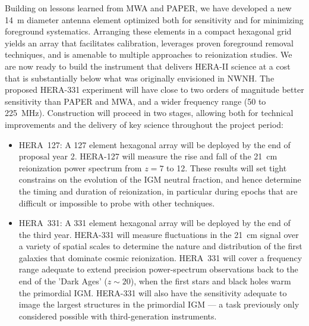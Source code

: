 \documentclass[preprint]{aastex}
\begin{document}
Building on lessons learned from MWA and PAPER, we have developed a new 14~m diameter antenna element 
optimized both for sensitivity and for minimizing foreground systematics.  
Arranging these elements in a compact hexagonal grid yields an array that
facilitates calibration, leverages proven foreground removal techniques, and is amenable 
to multiple approaches to reionization studies. We are now ready to build the instrument
that delivers HERA-II science at a cost that is substantially below what was originally envisioned in NWNH.
The proposed HERA-331 experiment will have close to two orders of magnitude better
sensitivity than PAPER and MWA, and a wider frequency range (50 to 225~MHz). 
Construction will proceed in two stages, allowing both for technical improvements and the delivery of 
key science throughout the project period: 

\begin{itemize}[noitemsep,nolistsep]

\item HERA~127: A 127 element hexagonal array will be deployed by
the end of proposal year 2. HERA-127 will measure the rise and fall of the
21~cm reionization power spectrum from $z = 7$ to 12. These results will set tight
constrains on the evolution of the IGM neutral fraction, and hence determine
the timing and duration of reionization, in particular during epochs that are difficult or impossible to
probe with other techniques.

\item HERA~331: A 331 element hexagonal array will be deployed by the end of the third year. HERA-331 
will measure fluctuations in the 21~cm signal over a variety of spatial
scales to determine the nature and distribution of the first galaxies
that dominate cosmic reionization. HERA~331 will cover a frequency range adequate to extend precision
power-spectrum observations back to the end of the 'Dark Ages' ($z \sim 20$), 
when the first stars and black holes warm the primordial IGM. HERA-331 will also have the 
sensitivity adequate to image the largest structures in the primordial
IGM --- a task previously only considered possible with third-generation
instruments. 

\end{itemize}
\end{document}
